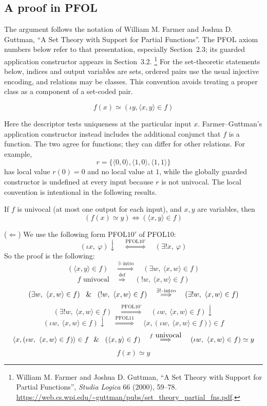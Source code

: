 \subsection{A proof in PFOL}
The argument follows the notation of William M. Farmer and Joshua D.
Guttman, ``A Set Theory with Support for Partial Functions''. The PFOL
axiom numbers below refer to that presentation, especially Section~2.3;
its guarded application constructor appears in Section~3.2.
\footnote{William M. Farmer and Joshua D. Guttman,
``A Set Theory with Support for Partial Functions'',
\emph{Studia Logica} 66 (2000), 59--78.
\url{https://web.cs.wpi.edu/~guttman/pubs/set_theory_partial_fns.pdf}.}
For the set-theoretic statements below, indices and output variables are
sets, ordered pairs use the usual injective encoding, and relations may
be classes. This convention avoids treating a proper class as a component
of a set-coded pair.
\begin{definition}
\[
f(x) \simeq \left(\iota y, \langle x,y\rangle\in f\right)
\]
\end{definition}
Here the descriptor tests uniqueness at the particular input $x$.
Farmer--Guttman's application constructor instead includes the additional
conjunct that $f$ is a function. The two agree for functions; they can
differ for other relations. For example,
\[
r=\{\langle0,0\rangle,\langle1,0\rangle,\langle1,1\rangle\}
\]
has local value $r(0)=0$ and no local value at $1$, while the globally
guarded constructor is undefined at every input because $r$ is not
univocal. The local convention is intentional in the following results.

\begin{theorem}
If $f$ is univocal (at most one output for each input), and $x,y$ are
variables, then
\[
\left(f(x)\simeq y\right)\iff \left(\langle x,y\rangle\in f\right)
\]
\end{theorem}
\Proof
($\Leftarrow$) We use the following form PFOL$10'$ of PFOL10:
\[
(\iota x,\ \varphi)\downarrow
\quad\overset{\mbox{PFOL10}'}{\Longleftrightarrow}\quad
(\exists!x,\ \varphi)
\]
So the proof is the following:
\[
\left(\langle x,y\rangle\in f\right)
\quad\overset{\exists\mbox{--intro}}{\Longrightarrow}\quad
\left(\exists w,\ \langle x,w\rangle\in f\right)
\]
\[
f\mbox{ univocal}
\quad\overset{\mbox{def}}{\Longrightarrow}\quad
\left(! w,\ \langle x,w\rangle\in f\right)
\]
\[
\left(\exists w,\ \langle x,w\rangle\in f\right)
\ \ \&\ \ 
\left(! w,\ \langle x,w\rangle\in f\right)
\quad\overset{\exists!\text{--intro}}{\Longrightarrow}\quad
\left(\exists! w,\ \langle x,w\rangle\in f\right)
\]
\[
\left(\exists! w,\ \langle x,w\rangle\in f\right)
\quad\overset{\mbox{PFOL10}'}{\Longrightarrow}\quad
\left(\iota w,\ \langle x,w\rangle\in f\right)\downarrow
\]
\[
\left(\iota w,\ \langle x,w\rangle\in f\right)\downarrow
\quad\overset{\mbox{PFOL11}}{\Longrightarrow}\quad
\langle x,(\iota w,\ \langle x,w\rangle\in f)\rangle\in f
\]
\[
\langle x,(\iota w,\ \langle x,w\rangle\in f)\rangle\in f
\ \ \&\ \ 
\left(\langle x,y\rangle\in f\right)
\quad\overset{f \mbox{ univocal}}{\Longrightarrow}\quad
(\iota w,\ \langle x,w\rangle\in f) \simeq y
\]
\[
f(x) \simeq y
\]

